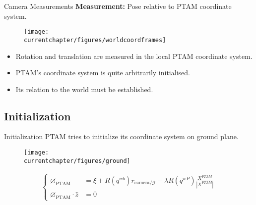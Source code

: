     \begin{frame}{Camera Measurements}
        \textbf{Measurement: } Pose relative to PTAM coordinate system.
        \vspace{-0.4cm}
        \begin{figure}[H]
        \centering
            \texttt{[image: \\currentchapter/figures/worldcoordframes]}
        \end{figure}

        \vspace{-1cm}
        \begin{itemize}
            \item Rotation and translation are measured in the local PTAM coordinate system.
            \item PTAM's coordinate system is quite arbitrarily initialised.
            \item Its relation to the world must be established.
        \end{itemize}
    \end{frame}
    \note{}


    \subsection{Initialization}
    \begin{frame}{Initialization}
        PTAM tries to initialize its coordinate system on ground plane.
        \vspace{-0.5cm}
        \begin{figure}[h]
        \centering
            \texttt{[image: \\currentchapter/figures/ground]}
        \end{figure}

        \vspace{-1cm}
        \begin{align*}
            \left\lbrace
            \begin{array}{ll}
                \varnothing_{\text{PTAM}} &= \xi + R(q^{wb}) r_{\text{camera}/\mathcal{G}} + \lambda R(q^{wP}) \frac{X^{PTAM}}{|X^{PTAM}|} \\
                \varnothing_{\text{PTAM}} \cdot \hat{z} &= 0
            \end{array}\right. \\
        \end{align*}
    \end{frame}

